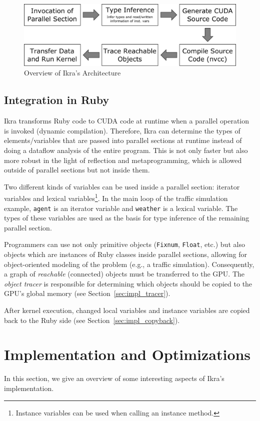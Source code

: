\documentclass[preprint]{sigplanconf}
\begin{document}
\begin{figure}[!tp]
    \includegraphics[width=\columnwidth]{high_level_arch.pdf}
    \caption{Overview of Ikra's Architecture}
    \label{fig:overview_arch}
\end{figure}

\subsection{Integration in Ruby}
Ikra transforms Ruby code to CUDA code at runtime when a parallel operation is invoked (dynamic compilation). Therefore, Ikra can determine the types of elements/variables that are passed into parallel sections at runtime instead of doing a dataflow analysis of the entire program. This is not only faster but also more robust in the light of reflection and metaprogramming, which is allowed outside of parallel sections but not inside them.

Two different kinds of variables can be used inside a parallel section: iterator variables and lexical variables\footnote{Instance variables can be used when calling an instance method.}. In the main loop of the traffic simulation example, \texttt{agent} is an iterator variable and \texttt{weather} is a lexical variable. The types of these variables are used as the basis for type inference of the remaining parallel section.

Programmers can use not only primitive objects (\texttt{Fixnum}, \texttt{Float}, etc.) but also objects which are instances of Ruby classes inside parallel sections, allowing for object-oriented modeling of the problem (e.g., a traffic simulation). Consequently, a graph of \emph{reachable} (connected) objects must be transferred to the GPU. The \emph{object tracer} is responsible for determining which objects should be copied to the GPU's global memory (see Section~\ref{sec:impl_tracer}).

After kernel execution, changed local variables and instance variables are copied back to the Ruby side (see Section~\ref{sec:impl_copyback}).


\section{Implementation and Optimizations}
In this section, we give an overview of some interesting aspects of Ikra's implementation.
\end{document}
